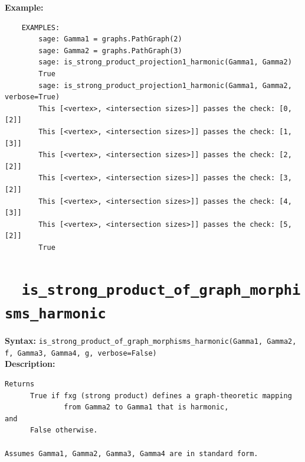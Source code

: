 \documentclass{article}
\begin{document}
\textbf{Example:}
\begin{verbatim}
    EXAMPLES:
        sage: Gamma1 = graphs.PathGraph(2)
        sage: Gamma2 = graphs.PathGraph(3)
        sage: is_strong_product_projection1_harmonic(Gamma1, Gamma2) 
        True
        sage: is_strong_product_projection1_harmonic(Gamma1, Gamma2, verbose=True) 
        This [<vertex>, <intersection sizes>]] passes the check: [0, [2]]
        This [<vertex>, <intersection sizes>]] passes the check: [1, [3]]
        This [<vertex>, <intersection sizes>]] passes the check: [2, [2]]
        This [<vertex>, <intersection sizes>]] passes the check: [3, [2]]
        This [<vertex>, <intersection sizes>]] passes the check: [4, [3]]
        This [<vertex>, <intersection sizes>]] passes the check: [5, [2]]
        True
\end{verbatim}

\section{\tt \ \ is\_strong\_product\_of\_graph\_morphisms\_harmonic}

\textbf{Syntax:}
\verb}is_strong_product_of_graph_morphisms_harmonic(Gamma1, Gamma2, f, Gamma3, Gamma4, g, verbose=False)}\\

\textbf{Description:}
\begin{verbatim}
Returns 
      True if fxg (strong product) defines a graph-theoretic mapping
              from Gamma2 to Gamma1 that is harmonic, 
and 
      False otherwise. 

Assumes Gamma1, Gamma2, Gamma3, Gamma4 are in standard form.
\end{verbatim}
\end{document}
